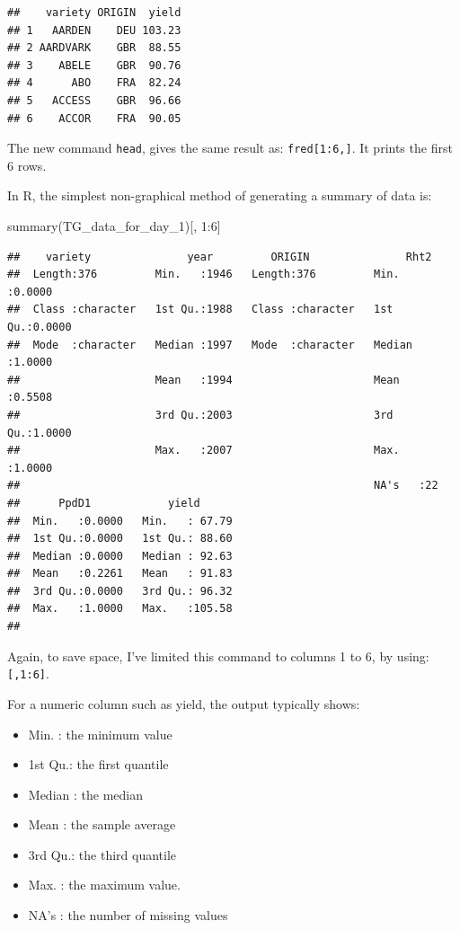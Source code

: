 \documentclass[
]{book}
\newenvironment{Shaded}{\begin{snugshade}}{\end{snugshade}}
\newcommand{\DecValTok}[1]{\textcolor[rgb]{0.00,0.00,0.81}{#1}}
\newcommand{\FunctionTok}[1]{\textcolor[rgb]{0.00,0.00,0.00}{#1}}
\newcommand{\NormalTok}[1]{#1}
\newcommand{\SpecialCharTok}[1]{\textcolor[rgb]{0.00,0.00,0.00}{#1}}
\providecommand{\tightlist}{%
  \setlength{\itemsep}{0pt}\setlength{\parskip}{0pt}}
\begin{document}
\begin{verbatim}
##    variety ORIGIN  yield
## 1   AARDEN    DEU 103.23
## 2 AARDVARK    GBR  88.55
## 3    ABELE    GBR  90.76
## 4      ABO    FRA  82.24
## 5   ACCESS    GBR  96.66
## 6    ACCOR    FRA  90.05
\end{verbatim}

The new command \texttt{head}, gives the same result as: \texttt{fred{[}1:6,{]}}. It prints the first 6 rows.

In R, the simplest non-graphical method of generating a summary of data is:

\begin{Shaded}
\begin{Highlighting}[]
\FunctionTok{summary}\NormalTok{(TG\_data\_for\_day\_1)[, }\DecValTok{1}\SpecialCharTok{:}\DecValTok{6}\NormalTok{]}
\end{Highlighting}
\end{Shaded}

\begin{verbatim}
##    variety               year         ORIGIN               Rht2       
##  Length:376         Min.   :1946   Length:376         Min.   :0.0000  
##  Class :character   1st Qu.:1988   Class :character   1st Qu.:0.0000  
##  Mode  :character   Median :1997   Mode  :character   Median :1.0000  
##                     Mean   :1994                      Mean   :0.5508  
##                     3rd Qu.:2003                      3rd Qu.:1.0000  
##                     Max.   :2007                      Max.   :1.0000  
##                                                       NA's   :22      
##      PpdD1            yield       
##  Min.   :0.0000   Min.   : 67.79  
##  1st Qu.:0.0000   1st Qu.: 88.60  
##  Median :0.0000   Median : 92.63  
##  Mean   :0.2261   Mean   : 91.83  
##  3rd Qu.:0.0000   3rd Qu.: 96.32  
##  Max.   :1.0000   Max.   :105.58  
## 
\end{verbatim}

Again, to save space, I've limited this command to columns 1 to 6, by using: \texttt{{[},1:6{]}}.

For a numeric column such as yield, the output typically shows:

\begin{itemize}
\tightlist
\item
  Min. : the minimum value
\item
  1st Qu.: the first quantile
\item
  Median : the median
\item
  Mean : the sample average
\item
  3rd Qu.: the third quantile
\item
  Max. : the maximum value.
\item
  NA's : the number of missing values
\end{itemize}
\end{document}
